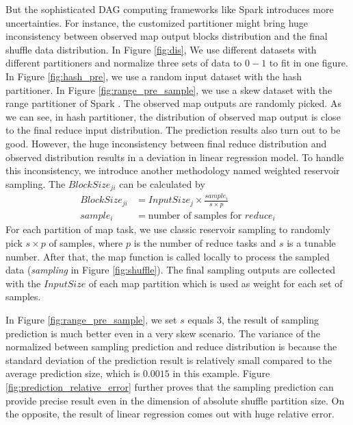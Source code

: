 But the sophisticated DAG computing frameworks like Spark introduces more uncertainties. For instance, the customized partitioner might bring huge inconsistency between observed map output blocks distribution and the final shuffle data distribution. In Figure \ref{fig:dis}, We use different datasets with different partitioners and normalize three sets of data to $0-1$ to fit in one figure. In Figure \ref{fig:hash_pre}, we use a random input dataset with the hash partitioner. In Figure \ref{fig:range_pre_sample}, we use a skew dataset with the range partitioner of Spark \cite{apachespark}.
The observed map outputs are randomly picked. As we can see, in hash partitioner, the distribution of observed map output is close to the final reduce input distribution. The prediction results also turn out to be good. However, the huge inconsistency between final reduce distribution and observed distribution results in a deviation in linear regression model.
To handle this inconsistency, we introduce another methodology named weighted reservoir sampling. The $BlockSize_{ji}$ can be calculated by
\begin{equation}
\label{equationsample}
\begin{aligned}
	BlockSize_{ji} &= {{InputSize_j \times \frac{sample_i}{s \times p}}} \\
	sample_i &= \text{number of samples for $reduce_i$}
\end{aligned}
\end{equation}
For each partition of map task, we use classic reservoir sampling to randomly pick $s \times p$ of samples, where $p$ is the number of reduce tasks and $s$ is a tunable number. After that, the map function is called locally to process the sampled data (\textit{sampling} in Figure \ref{fig:shuffle}). The final sampling outputs are collected with the $InputSize$ of each map partition which is used as weight for each set of samples.

In Figure \ref{fig:range_pre_sample}, we set $s$ equals $3$, the result of sampling prediction is much better even in a very skew scenario. The variance of the normalized between sampling prediction and reduce distribution is because the standard deviation of the prediction result is relatively small compared to the average prediction size, which is $0.0015$ in this example. Figure \ref{fig:prediction_relative_error} further proves that the sampling prediction can provide precise result even in the dimension of absolute shuffle partition size. On the opposite, the result of linear regression comes out with huge relative error.

